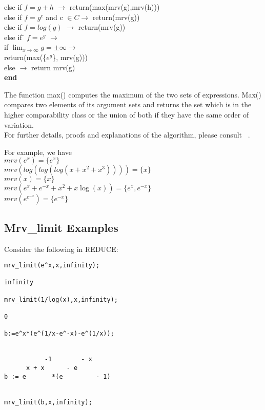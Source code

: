 {\begin{tabbing}
  else if $f=g+h$ $\rightarrow$   return(max(mrv(g),mrv(h))) \\
  else if $f=g^{c}$ and c $\in C \rightarrow$   return(mrv(g)) \\
  else if $f=log(g)$ $\rightarrow$   return(mrv(g)) \\
  else if \= $f=e^{g}$ $\rightarrow$  \\
   \>   if $\lim_{x \rightarrow \infty} g=\pm\infty \rightarrow$ \\
   \>        return(max(\{$e^{g}$\}, mrv(g))) \\
    \>  else $\rightarrow $ return mrv(g) \\
\bf{end}
\end{tabbing}

\vspace{5 mm}
The function max() computes the maximum of the two sets of expressions. Max() compares two elements of its argument sets and returns the set which is in the higher comparability class or the union of both if they have the same order of variation. \\

For further details, proofs and explanations of the algorithm, please consult ~\cite{Grn96}.
\pagebreak

For example, we have \\

$mrv(e^{x})=\{e^x\}$ \\
$mrv(log(log(log(x+x^2+x^3))))=\{x\} $ \\
$mrv(x)=\{x\} $\\
$mrv(e^x+e^{-x}+x^2+x \log(x))= \{e^x,e^{-x} \}$ \\
$mrv(e^{e^{-x}})=\{e^{-x} \} $ \\

\subsection{Mrv\_limit Examples}
Consider the following in \small{REDUCE}:
\begin{verbatim}
mrv_limit(e^x,x,infinity);

infinity

mrv_limit(1/log(x),x,infinity);

0

b:=e^x*(e^(1/x-e^-x)-e^(1/x));


           -1        - x
      x + x      - e
b := e       *(e         - 1)


mrv_limit(b,x,infinity);



\end{verbatim}}
